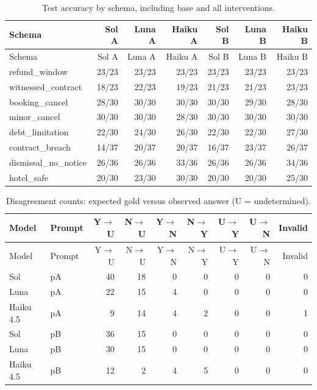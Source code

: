 \begingroup\small\setlength{\tabcolsep}{4pt}
\begin{longtable}{lrrrrrr}
\caption{Test accuracy by schema, including base and all interventions.}\\
\toprule
Schema & Sol A & Luna A & Haiku A & Sol B & Luna B & Haiku B \\
\midrule\endfirsthead
\toprule
Schema & Sol A & Luna A & Haiku A & Sol B & Luna B & Haiku B \\
\midrule\endhead
\bottomrule\endfoot
refund\_window & 23/23 & 23/23 & 23/23 & 23/23 & 23/23 & 23/23 \\
witnessed\_contract & 18/23 & 22/23 & 19/23 & 21/23 & 21/23 & 23/23 \\
booking\_cancel & 28/30 & 30/30 & 30/30 & 30/30 & 29/30 & 28/30 \\
minor\_cancel & 30/30 & 30/30 & 28/30 & 30/30 & 30/30 & 30/30 \\
debt\_limitation & 22/30 & 24/30 & 26/30 & 22/30 & 22/30 & 27/30 \\
contract\_breach & 14/37 & 20/37 & 20/37 & 16/37 & 23/37 & 26/37 \\
dismissal\_no\_notice & 26/36 & 26/36 & 33/36 & 26/36 & 26/36 & 34/36 \\
hotel\_safe & 20/30 & 23/30 & 30/30 & 20/30 & 20/30 & 25/30 \\
\end{longtable}\endgroup


\begingroup\small\setlength{\tabcolsep}{4pt}
\begin{longtable}{llrrrrrrr}
\caption{Disagreement counts: expected gold versus observed answer (U = undetermined).}\\
\toprule
Model & Prompt & Y$\to$U & N$\to$U & Y$\to$N & N$\to$Y & U$\to$Y & U$\to$N & Invalid \\
\midrule\endfirsthead
\toprule
Model & Prompt & Y$\to$U & N$\to$U & Y$\to$N & N$\to$Y & U$\to$Y & U$\to$N & Invalid \\
\midrule\endhead
\bottomrule\endfoot
Sol & pA & 40 & 18 & 0 & 0 & 0 & 0 & 0 \\
Luna & pA & 22 & 15 & 4 & 0 & 0 & 0 & 0 \\
Haiku 4.5 & pA & 9 & 14 & 4 & 2 & 0 & 0 & 1 \\
Sol & pB & 36 & 15 & 0 & 0 & 0 & 0 & 0 \\
Luna & pB & 30 & 15 & 0 & 0 & 0 & 0 & 0 \\
Haiku 4.5 & pB & 12 & 2 & 4 & 5 & 0 & 0 & 0 \\
\end{longtable}\endgroup


